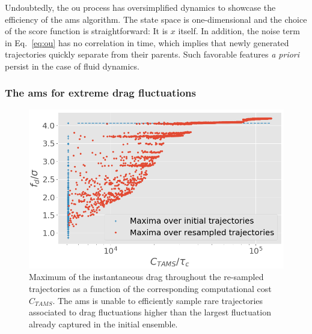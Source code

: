 \documentclass{jfm}
\newcommand{\EL}[1]{{\color{myred}{#1}}}
\begin{document}
Undoubtedly, the \acl{ou} process has oversimplified dynamics to showcase the efficiency of the \ac{ams} algorithm.
The state space is one-dimensional and the choice of the score function is straightforward: It is $x$ itself.
In addition, the noise term in Eq.~\eqref{eq:ou} has no correlation in time, which implies that newly generated trajectories quickly separate from their parents. Such favorable features \EL{do not} \textit{a priori} persist in the case of fluid dynamics.


\subsubsection{The \ac{ams} for extreme drag fluctuations}
\label{sec:ams_drag}

\begin{figure}
  \centering
  \includegraphics[width=.7\linewidth]{AMS_drag_resampling/AMS_drag_resampling.png}
  \caption{\label{fig:AMS_drag_resampling} Maximum of the instantaneous drag throughout the re-sampled trajectories as a function of the corresponding computational cost $C_{TAMS}$. The \ac{ams} is unable to efficiently sample rare trajectories associated to drag fluctuations higher than the largest fluctuation already captured in the initial ensemble.}
\end{figure}
\end{document}
